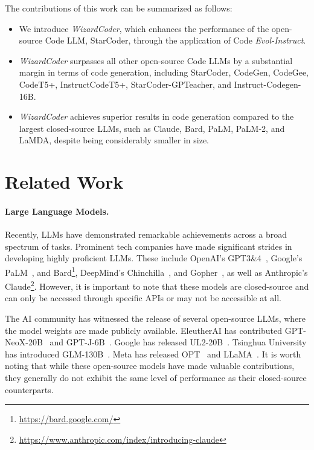 \documentclass{article}
\newcommand{\name}{\emph{Evol-Instruct}}
\newcommand{\modelname}{\emph{WizardCoder}}
\begin{document}
The contributions of this work can be summarized as follows:
\begin{itemize}
    \item We introduce \modelname{}, which enhances the performance of the open-source Code LLM, StarCoder, through the application of Code \name{}.
    \item \modelname{} surpasses all other open-source Code LLMs by a substantial margin in terms of code generation, including StarCoder, CodeGen, CodeGee, CodeT5+, InstructCodeT5+, StarCoder-GPTeacher, and Instruct-Codegen-16B.
    \item \modelname{} achieves superior results in code generation compared to the largest closed-source LLMs, such as Claude, Bard, PaLM, PaLM-2, and LaMDA, despite being considerably smaller in size.
\end{itemize}

 \section{Related Work}

\paragraph{Large Language Models.} Recently, LLMs have demonstrated remarkable achievements across a broad spectrum of tasks. Prominent tech companies have made significant strides in developing highly proficient LLMs. These include OpenAI's GPT3\&4~\cite{GPT3,GPT4}, Google's PaLM~\cite{PaLM,palm2}, and Bard\footnote{\url{https://bard.google.com/}}, DeepMind's Chinchilla~\cite{Chinchilla}, and Gopher~\cite{gopher}, as well as Anthropic's Claude\footnote{\url{https://www.anthropic.com/index/introducing-claude}}. However, it is important to note that these models are closed-source and can only be accessed through specific APIs or may not be accessible at all.

The AI community has witnessed the release of several open-source LLMs, where the model weights are made publicly available. EleutherAI has contributed GPT-NeoX-20B~\cite{GPT-NeoX-20B} and GPT-J-6B~\cite{gpt-j}. Google has released UL2-20B~\cite{UL2}. Tsinghua University has introduced GLM-130B~\cite{GLM-130B}. Meta has released OPT~\cite{opt} and LLaMA~\cite{llama}. It is worth noting that while these open-source models have made valuable contributions, they generally do not exhibit the same level of performance as their closed-source counterparts.
\end{document}
